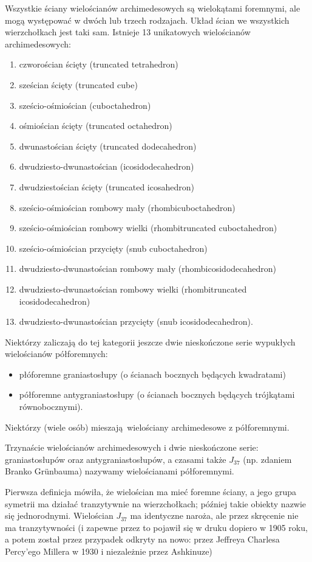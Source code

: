 

Wszystkie ściany wielościanów archimedesowych są wielokątami foremnymi, ale mogą występować w dwóch lub trzech rodzajach.
Układ ścian we wszystkich wierzchołkach jest taki sam.
Istnieje 13 unikatowych wielościanów archimedesowych:
\begin{enumerate}
\item czworościan ścięty (truncated tetrahedron)
\item sześcian ścięty (truncated cube)
\item sześcio-ośmiościan (cuboctahedron)
\item ośmiościan ścięty (truncated octahedron)
\item dwunastościan ścięty (truncated dodecahedron)
\item dwudziesto-dwunastościan (icosidodecahedron)
\item dwudziestościan ścięty (truncated icosahedron)
\item sześcio-ośmiościan rombowy mały (rhombicuboctahedron)
\item sześcio-ośmiościan rombowy wielki (rhombitruncated cuboctahedron)
\item sześcio-ośmiościan przycięty (snub cuboctahedron)
\item dwudziesto-dwunastościan rombowy mały (rhombicosidodecahedron)
\item dwudziesto-dwunastościan rombowy wielki (rhombitruncated icosidodecahedron)
\item dwudziesto-dwunastościan przycięty (snub icosidodecahedron).
\end{enumerate}
Niektórzy zaliczają do tej kategorii jeszcze dwie nieskończone serie wypukłych wielościanów półforemnych:
\begin{itemize}
\item płóforemne graniastosłupy (o ścianach bocznych będących kwadratami)
\item półforemne antygraniastosłupy (o ścianach bocznych będących trójkątami równobocznymi).
\end{itemize} 

Niektórzy (wiele osób) mieszają wielościany archimedesowe z półforemnymi.

\begin{definition}
    Trzynaście wielościanów archimedesowych i dwie nieskończone serie: graniastosłupów oraz antygraniastosłupów, a czasami także $J_{37}$ (np. zdaniem Branko Grünbauma) nazywamy wielościanami półforemnymi.
\end{definition}

Pierwsza definicja mówiła, że wielościan ma mieć foremne ściany, a jego grupa symetrii ma działać tranzytywnie na wierzchołkach; później takie obiekty nazwie się jednorodnymi.
Wielościan $J_{37}$ ma identyczne naroża, ale przez skręcenie nie ma tranzytywności (i zapewne przez to pojawił się w druku dopiero w 1905 roku, a potem został przez przypadek odkryty na nowo: przez Jeffreya Charlesa Percy'ego Millera w 1930 i niezależnie przez Ashkinuze)

